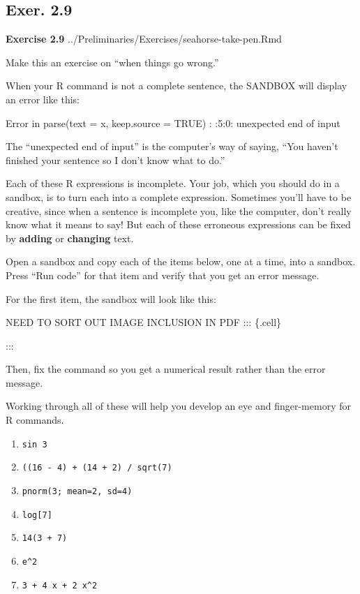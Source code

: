 \documentclass[
  letterpaper,
  DIV=11,
  numbers=noendperiod,
  oneside]{article}
\providecommand{\tightlist}{%
  \setlength{\itemsep}{0pt}\setlength{\parskip}{0pt}}\usepackage{longtable,booktabs,array}
\begin{document}
\begin{multicols}{2}
\hypertarget{exer.-2.9}{%
\section*{Exer. 2.9}\label{exer.-2.9}}

\textbf{Exercise 2.9} ../Preliminaries/Exercises/seahorse-take-pen.Rmd

Make this an exercise on ``when things go wrong.''

When your R command is not a complete sentence, the SANDBOX will display
an error like this:

{Error in parse(text = x, keep.source = TRUE) : :5:0: unexpected end of
input }

The ``unexpected end of input'' is the computer's way of saying, ``You
haven't finished your sentence so I don't know what to do.''

Each of these R expressions is incomplete. Your job, which you should do
in a sandbox, is to turn each into a complete expression. Sometimes
you'll have to be creative, since when a sentence is incomplete you,
like the computer, don't really know what it means to say! But each of
these erroneous expressions can be fixed by \textbf{adding} or
\textbf{changing} text.

Open a sandbox and copy each of the items below, one at a time, into a
sandbox. Press ``Run code'' for that item and verify that you get an
error message.

For the first item, the sandbox will look like this:

NEED TO SORT OUT IMAGE INCLUSION IN PDF ::: \{.cell\}

:::

Then, fix the command so you get a numerical result rather than the
error message.

Working through all of these will help you develop an eye and
finger-memory for R commands.

\begin{enumerate}
\def\labelenumi{\roman{enumi}.}
\tightlist
\item
  \texttt{sin\ 3}
\item
  \texttt{((16\ -\ 4)\ +\ (14\ +\ 2)\ /\ sqrt(7)}
\item
  \texttt{pnorm(3;\ mean=2,\ sd=4)}
\item
  \texttt{log{[}7{]}}
\item
  \texttt{14(3\ +\ 7)}
\item
  \texttt{e\^{}2}
\item
  \texttt{3\ +\ 4\ x\ +\ 2\ x\^{}2}
\end{enumerate}


\end{multicols}
\end{document}
